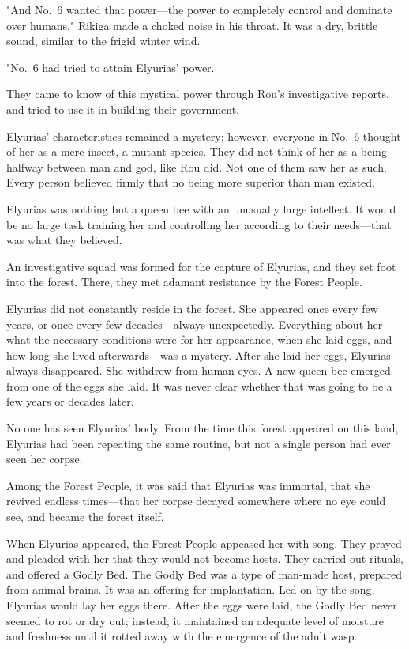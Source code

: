 "\el And No.~6 wanted that power---the power to completely control and
dominate over humans." Rikiga made a choked noise in his throat. It was
a dry, brittle sound, similar to the frigid winter wind.

"No.~6 had tried to attain Elyurias' power.

They came to know of this mystical power through Rou's investigative
reports, and tried to use it in building their government.

Elyurias' characteristics remained a mystery; however, everyone in No.~6
thought of her as a mere insect, a mutant species. They did not think of
her as a being halfway between man and god, like Rou did. Not one of
them saw her as such. Every person believed firmly that no being more
superior than man existed.

Elyurias was nothing but a queen bee with an unusually large intellect.
It would be no large task training her and controlling her according to
their needs---that was what they believed.

An investigative squad was formed for the capture of Elyurias, and they
set foot into the forest. There, they met adamant resistance by the
Forest People.

Elyurias did not constantly reside in the forest. She appeared once
every few years, or once every few decades---always unexpectedly.
Everything about her---what the necessary conditions were for her
appearance, when she laid eggs, and how long she lived afterwards---was a
mystery. After she laid her eggs, Elyurias always disappeared. She
withdrew from human eyes. A new queen bee emerged from one of the eggs
she laid. It was never clear whether that was going to be a few years or
decades later.

No one has seen Elyurias' body. From the time this forest appeared on
this land, Elyurias had been repeating the same routine, but not a
single person had ever seen her corpse.

Among the Forest People, it was said that Elyurias was immortal, that
she revived endless times---that her corpse decayed somewhere where no eye
could see, and became the forest itself.

When Elyurias appeared, the Forest People appeased her with song. They
prayed and pleaded with her that they would not become hosts. They
carried out rituals, and offered a Godly Bed. The Godly Bed was a type
of man-made host, prepared from animal brains. It was an offering for
implantation. Led on by the song, Elyurias would lay her eggs there.
After the eggs were laid, the Godly Bed never seemed to rot or dry out;
instead, it maintained an adequate level of moisture and freshness until
it rotted away with the emergence of the adult wasp.

